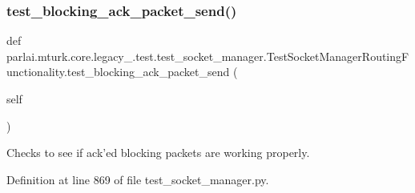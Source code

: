 \subsubsection{\texorpdfstring{test\+\_\+blocking\+\_\+ack\+\_\+packet\+\_\+send()}{test\_blocking\_ack\_packet\_send()}}
{\footnotesize\ttfamily def parlai.\+mturk.\+core.\+legacy\+\_.\+test.\+test\+\_\+socket\+\_\+manager.\+Test\+Socket\+Manager\+Routing\+Functionality.\+test\+\_\+blocking\+\_\+ack\+\_\+packet\+\_\+send (\begin{DoxyParamCaption}\item[{}]{self }\end{DoxyParamCaption})}

\begin{DoxyVerb}Checks to see if ack'ed blocking packets are working properly.
\end{DoxyVerb}
 

Definition at line 869 of file test\+\_\+socket\+\_\+manager.\+py.



